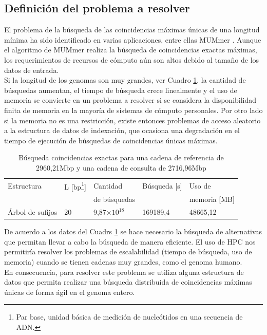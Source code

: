 \documentclass[12pt,a4paper]{article}
\providecommand{\e}[1]{\ensuremath{\times 10^{#1}}}
\begin{document}
\subsection{Definición del problema a resolver}
\indent
El problema de la búsqueda de las coincidencias máximas únicas de una longitud mínima ha sido identificado en varias aplicaciones, entre ellas MUMmer \cite{Mummer3}. Aunque el algoritmo de MUMmer realiza la búsqueda de coincidencias exactas máximas, los requerimientos de recursos de cómputo aún son altos debido al tamaño de los datos de entrada.\\
\indent
Si la longitud de los genomas son muy grandes, ver Cuadro \ref{tab:buscar3}, 
la cantidad de búsquedas aumentan, el tiempo de búsqueda
crece linealmente y el uso de memoria se convierte en un problema a resolver si
se considera la disponibilidad finita de memoria en la mayoría de sistemas de
cómputo personales. Por otro lado si la memoria no es una restricci\'on, existe entonces problemas de acceso aleatorio a la
estructura de datos de indexaci\'on, que ocasiona una degradaci\'on en el tiempo de ejecuci\'on de b\'usquedas de coincidencias \'unicas m\'aximas.\\
\begin{table}[ h!]
  \begin{small}
    \begin{center}
      \begin{tabular}{lllll}
        Estructura & L [bp\footnote{Par base, unidad básica de medición de nucleótidos en una secuencia de ADN.}] & Cantidad  & Búsqueda [s] & Uso de\\
        & & de búsquedas & & memoria [MB]\\
        \hline
        Árbol de sufijos & 20 & 9,87\e{18}  & 169189,4 & 48665,12\\
        \hline
      \end{tabular}
    \end{center}
  \end{small}
  \caption{Búsqueda coincidencias exactas para una cadena de referencia de 
  2960,21Mbp y una cadena de consulta de 2716,96Mbp}
  \label{tab:buscar3}
\end{table}
\indent
De acuerdo a los datos del Cuadrs \ref{tab:buscar3} se hace necesario la búsqueda de alternativas que 
permitan llevar a cabo la búsqueda de manera eficiente. El uso de HPC nos permitiría
resolver los problemas de escalabilidad (tiempo de búsqueda, uso de memoria) cuando 
se tienen cadenas muy grandes, como el genoma humano.\\
En consecuencia, para resolver este problema se utiliza alguna estructura de datos que 
permita realizar una búsqueda distribuida de coincidencias máximas únicas de forma ágil 
en el genoma entero. 
\end{document}
